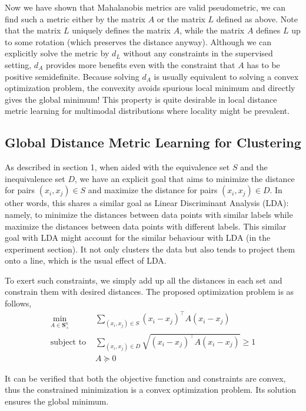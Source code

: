 \documentclass[12pt]{article}
\newcommand\SM{\mathbf{S}}
\newcommand\T{^\top}
\newcommand{\st}{\text{subject to }}
\begin{document}
Now we have shown that Mahalanobis metrics are valid pseudometric, we can find such a metric either by the matrix $A$ or the matrix $L$ defined as above. Note that the matrix $L$ uniquely defines the matrix $A$, while the matrix $A$ defines $L$ up to some rotation (which preserves the distance anyway). Although we can explicitly solve the metric by $d_L$ without any constraints in the supervised setting, $d_A$ provides more benefits even with the constraint that $A$ has to be positive semidefinite. Because solving $d_A$ is usually equivalent to solving a convex optimization problem, the convexity avoids spurious local minimum and directly gives the global minimum! This property is quite desirable in local distance metric learning for multimodal distributions where locality might be prevalent.

\subsection{Global Distance Metric Learning for Clustering}
As described in section 1, when aided with the equivalence set $S$ and the inequivalence set $D$, we have an explicit goal that aims to minimize the distance for pairs $(x_i,x_j)\in S$ and maximize the distance for pairs $(x_i,x_j)\in D$. In other words, this shares a similar goal as Linear Discriminant Analysis (LDA): namely, to minimize the distances between data points with similar labels while maximize the distances between data points with different labels.  This similar goal with LDA might account for the similar behaviour with LDA (in the experiment section). It not only clusters the data but also tends to project them onto a line, which is the usual effect of LDA.

To exert such constraints, we simply add up all the distances in each set and constrain them with desired distances. The proposed optimization problem is as follows,
\begin{align}
\min_{A\in\SM_+^n} & \sum_{(x_i,x_j)\in S} (x_i-x_j)\T A(x_i-x_j)\label{obj1} \\
\st & \sum_{(x_i,x_j)\in D} \sqrt{(x_i-x_j)\T A(x_i-x_j)} \geq 1 \label{const1}\\
& A\succeq 0\label{const2}
\end{align}

It can be verified that both the objective function and constraints are convex, thus the constrained minimization is a convex optimization problem. Its solution ensures the global minimum. 
\end{document}
